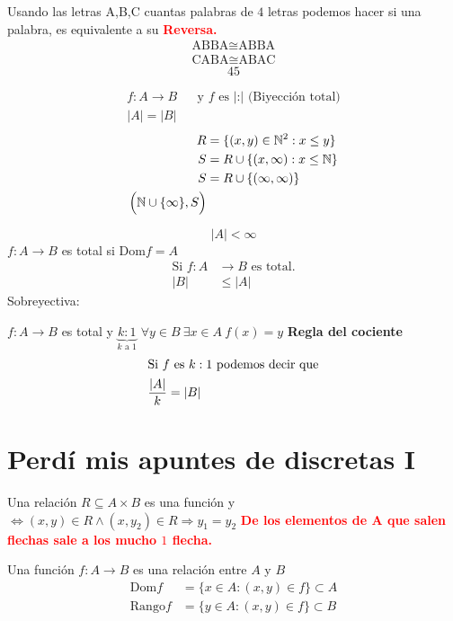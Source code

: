 \documentclass[../main.tex]{subfiles}
\begin{document}
Usando las letras A,B,C cuantas palabras de $4$ letras podemos hacer si una palabra,
es equivalente a su \textcolor{red}{ \textbf{Reversa.}}
\begin{align*}
	\text{ABBA} \cong \text{ABBA}\\
	\text{CABA} \cong \text{ABAC}
\end{align*}
{\Huge\[45\]}

\teorema
{
	\Huge
	\begin{align*}
		f:A\longrightarrow B &&\text{y $f$ es |:| (Biyección total)}\\
		|A| = |B|
	\end{align*}
}
\begin{align*}
	R &= \{(x,y)\in\mathbb{N}^2:x\leq y\}\\
	S &= R \cup\{(x,\infty):x\leq\mathbb{N}\}\\
	S &= R \cup\{(\infty,\infty)\}\\
	\Big{(}
	\mathbb{N} \cup \{\infty\},S
	\Big{)}
\end{align*}

\[|A| < \infty\]
$f:A\longrightarrow B$ es total si Dom$f=A$
\begin{align*}
	\text{Si } f:A&\longrightarrow B \text{ es total.}\\
	|B| &\leq |A|
\end{align*}
Sobreyectiva:

$f:A\longrightarrow B$ es total y $\underbrace{k:1}_{\text{$k$ a $1$}}$
$\forall y \in B\ \exists x \in A\ f(x)=y$
\teorema
\textbf{Regla del cociente}
\begin{align*}
	\intertext{Si $f$ es $k:1$ podemos decir que}
	\frac{|A|}{k} &= |B|
\end{align*}

\section{Perdí mis apuntes de discretas I}%
\label{sec:Perdí mis apuntes de discretas I}

Una relación $R\subseteq A\times B$ es una función y
$\Longleftrightarrow(x,y)\in R \wedge (x,y_2)\in R \Longrightarrow y_1=y_2$
\textcolor{red}{ \textbf{De los elementos de $\mathbf{A}$ que salen flechas sale
a los mucho {\Huge $1$} flecha.}}

Una función $f:A\longrightarrow B$ es una relación entre $A$ y $B$
{\Huge
	\begin{align*}
		\text{Dom}f&=\{x\in A:(x,y)\in f\}\subset A\\
		\text{Rango}f&=\{y\in A:(x,y)\in f\}\subset B
	\end{align*}
}
\end{document}
